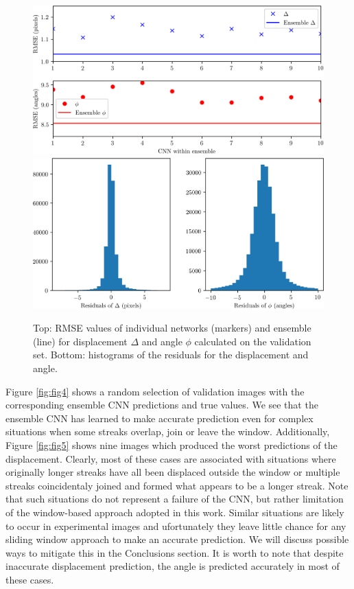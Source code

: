 \documentclass{svjour3}                     %
\begin{document}
\begin{figure}
\includegraphics[width=\textwidth]{figs/figure2a.png}
\includegraphics[width=\textwidth]{figs/figure2b.png}
\caption{Top: RMSE values of individual networks (markers) and ensemble (line) for displacement $\Delta$ and angle $\phi$ calculated on the validation set. Bottom: histograms of the residuals for the displacement and angle.}
\label{fig:fig3}
\end{figure}

Figure \ref{fig:fig4} shows a random selection of validation images with the corresponding ensemble CNN predictions and true values. We see that the ensemble CNN has learned to make accurate prediction even for complex situations when some streaks overlap, join or leave the window. Additionally, Figure \ref{fig:fig5} shows nine images which produced the worst predictions of the displacement. Clearly, most of these cases are associated with situations where originally longer streaks have all been displaced outside the window or multiple streaks coincidentaly joined and formed what appears to be a longer streak. Note that such situations do not represent a failure of the CNN, but rather limitation of the window-based approach adopted in this work. Similar situations are likely to occur in experimental images and ufortunately they leave little chance for any sliding window approach to make an accurate prediction. We will discuss possible ways to mitigate this in the Conclusions section. It is worth to note that despite inaccurate displacement prediction, the angle is predicted accurately in most of these cases. 
\end{document}

